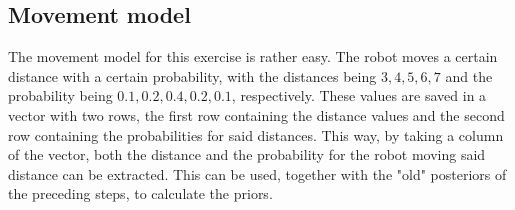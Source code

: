 \documentclass[11pt]{article}
\begin{document}
    \subsection{Movement model}\label{subsec:movem}
    The movement model for this exercise is rather easy.
    The robot moves a certain distance with a certain probability, with the distances being $3, 4, 5, 6, 7$ and the probability being $0.1, 0.2, 0.4, 0.2, 0.1$, respectively.
    These values are saved in a vector with two rows, the first row containing the distance values and the second row containing the probabilities for said distances.
    This way, by taking a column of the vector, both the distance and the probability for the robot moving said distance can be extracted.
    This can be used, together with the "old" posteriors of the preceding steps, to calculate the priors.
\end{document}
